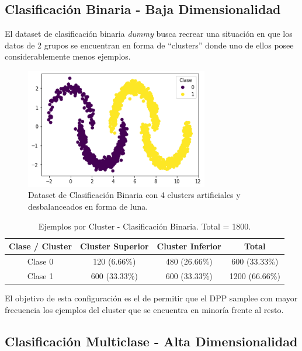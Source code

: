 \subsection{Clasificación Binaria - Baja Dimensionalidad}

El dataset de clasificación binaria \textit{dummy} busca recrear una situación en que los datos de 2 grupos se encuentran en forma de ``clusters'' donde uno de ellos posee considerablemente menos ejemplos.

\begin{figure}[ht]
    \centering
    \includegraphics[width=8cm]{img/tesis/binario.png}
    \caption{Dataset de Clasificación Binaria con 4 clusters artificiales y desbalanceados en forma de luna.}
    \label{fig:binaria}
\end{figure}

\begin{table}[ht]
\begin{tabular}{|c|c|c||c|}
\hline
Clase / Cluster & Cluster Superior & Cluster Inferior & Total \\ \hline
Clase 0         & 120 (6.66\%)              & 480 (26.66\%)  & 600 (33.33\%)  \\ \hline
Clase 1         & 600 (33.33\%)             & 600 (33.33\%)  & 1200 (66.66\%)            \\ \hline
\end{tabular}
\caption{Ejemplos por Cluster - Clasificación Binaria. Total = 1800.}
\label{table:binaria}
\end{table}

El objetivo de esta configuración es el de permitir que el DPP samplee con mayor frecuencia los ejemplos del cluster que se encuentra en minoría frente al resto.

\subsection{Clasificación Multiclase - Alta Dimensionalidad}

